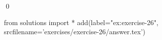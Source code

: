 
\begin{ex} 
  \label{ex:exercise-26}
  
  \qed
\end{ex} 
\begin{python0}
from solutions import *
add(label="ex:exercise-26",
    srcfilename='exercises/exercise-26/answer.tex') 
\end{python0}
